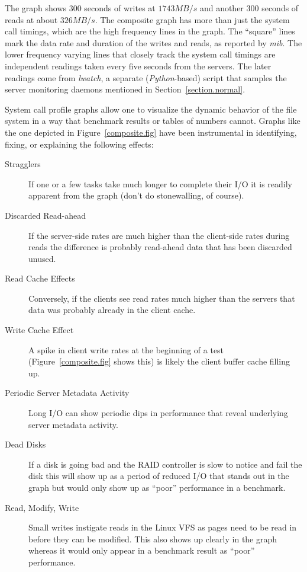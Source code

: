 \documentclass{article}
\begin{document}
The graph shows 300 seconds of writes at $1743 MB/s$ and another 300
seconds of reads at about $326 MB/s$.  The composite graph has more
than just the system call timings, which are the high frequency lines
in the graph.  The ``square'' lines mark the data rate and duration of the
writes and reads, as reported by {\em mib}.  The lower frequency varying
lines that closely track the system call timings are independent
readings taken every five seconds from the servers.  The later
readings come from {\em lwatch}, a separate ({\em Python}-based)
script that samples 
the server monitoring daemons mentioned in Section~\ref{section.normal}.

System call profile graphs allow one to visualize the dynamic behavior
of the file system in a way that benchmark results or tables of
numbers cannot.  Graphs like the one depicted in
Figure~\ref{composite.fig} have been instrumental in identifying,
fixing, or explaining the following effects: 
\begin{description}
\item [Stragglers] If one or a few tasks take much longer to complete
  their I/O it is readily apparent from the graph (don't do
  stonewalling, of course).
\item [Discarded Read-ahead]  If the server-side rates are much
  higher than the client-side rates during reads the difference is
  probably read-ahead data that has been discarded unused.
\item [Read Cache Effects] Conversely, if the clients see read rates
  much higher than the servers that data was probably already in the
  client cache.
\item [Write Cache Effect] A spike in client write rates at the
  beginning of a test (Figure~\ref{composite.fig} shows this) is
  likely the client buffer cache filling up.  
\item [Periodic Server Metadata Activity] Long I/O can show periodic
  dips in performance that reveal underlying server metadata activity.
\item [Dead Disks] If a disk is going bad and the RAID controller is
  slow to notice and fail the disk this will show up as a period of
  reduced I/O that stands out in the graph but would only show up as
  ``poor'' performance in a benchmark.
\item [Read, Modify, Write] Small writes instigate reads in the Linux
  VFS as pages need to be read in before they can be modified.  This
  also shows up clearly in the graph whereas it would only appear in a
  benchmark result as ``poor'' performance.
\end{description}
\end{document}
